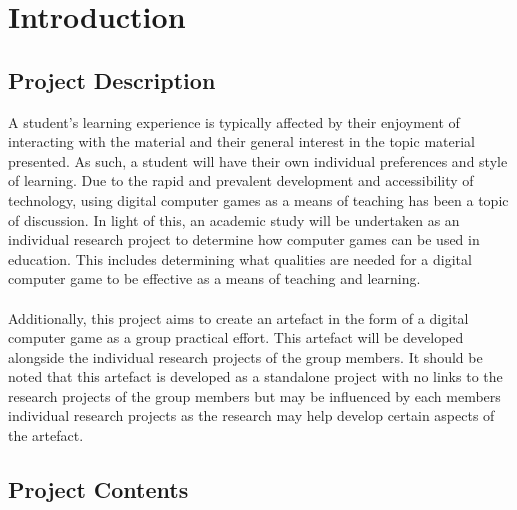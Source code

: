 
\chapter{Introduction} %

\label{Chapter1} %


\newcommand{\keyword}[1]{\textbf{#1}}
\newcommand{\tabhead}[1]{\textbf{#1}}
\newcommand{\code}[1]{\texttt{#1}}
\newcommand{\file}[1]{\1texttt{\bfseries#1}}
\newcommand{\option}[1]{\texttt{\itshape#1}}


\section{Project Description}
A student's learning experience is typically affected by their enjoyment of interacting with the material and their general interest in the topic material presented. As such, a student will have their own individual preferences and style of learning. Due to the rapid and prevalent development and accessibility of technology, using digital computer games as a means of teaching has been a topic of discussion. In light of this, an academic study will be undertaken as an individual research project to determine how computer games can be used in education. This includes determining what qualities are needed for a digital computer game to be effective as a means of teaching and learning.
\\\\
Additionally, this project aims to create an artefact in the form of a digital computer game as a group practical effort. This artefact will be developed alongside the individual research projects of the group members. It should be noted that this artefact is developed as a standalone project with no links to the research projects of the group members but may be influenced by each members individual research projects as the research may help develop certain aspects of the artefact.
\pagebreak
\section{Project Contents}
